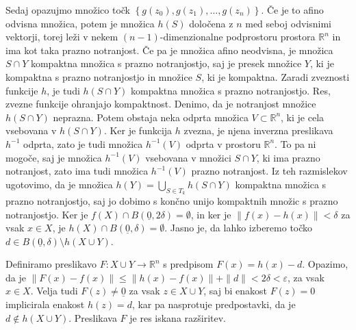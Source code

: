 \documentclass[mat1]{fmfdelo}
\newcommand{\R}{\mathbb R}
\newcommand{\0}{\underline{0}}
\begin{document}
\begin{dokaz}
Sedaj opazujmo množico točk $\left \{ g(z_0), g(z_1), \dots, g(z_n) \right \}$. Če je to afino odvisna množica, potem je množica $h(S)$ določena z $n$ med seboj odvisnimi vektorji, torej leži v nekem $(n-1)$-dimenzionalne podprostoru prostora $\R^n$ in ima kot taka prazno notranjost. Če pa je množica afino neodvisna, je množica $S \cap Y$ kompaktna množica s prazno notranjostjo, saj je presek množice $Y$, ki je kompaktna s prazno notranjostjo in množice $S$, ki je kompaktna. Zaradi zveznosti funkcije $h$, je tudi $h(S \cap Y)$ kompaktna množica s prazno notranjostjo. Res, zvezne funkcije ohranjajo kompaktnost. Denimo, da je notranjost množice $h(S \cap Y)$ neprazna. Potem obstaja neka odprta množica $V \subset \R^n$, ki je cela vsebovana v $h(S \cap Y)$. Ker je funkcija $h$ zvezna, je njena inverzna preslikava $h^{-1}$ odprta, zato je tudi množica $h^{-1}(V)$ odprta v prostoru $\R^n$. To pa ni mogoče, saj je množica $h^{-1}(V)$ vsebovana v množici $S \cap Y$, ki ima prazno notranjost, zato ima tudi množica $h^{-1}(V)$ prazno notranjost. Iz teh razmislekov ugotovimo, da je množica $h(Y) = \bigcup\limits_{S \in T_k} h(S \cap Y)$ kompaktna množica s prazno notranjostjo, saj jo dobimo s končno unijo kompaktnih množic s prazno notranjostjo. Ker je $f(X) \cap B(\0, 2 \delta) = \emptyset$, in ker je $\| f(x) - h(x) \| < \delta$ za vsak $x \in X$, je $h(X) \cap B(\0, \delta) = \emptyset$. Jasno je, da lahko izberemo točko $d \in B(\0, \delta) \setminus h(X \cup Y)$.

Definiramo preslikavo $F : X \cup Y \to \R^n$ s predpisom $F(x)  = h(x) - d$. Opazimo, da je $\| F(x) - f(x) \| \leq \| h(x) - f(x) \| + \| d \| < 2\delta < \varepsilon$, za vsak $x \in X$. Velja tudi $F(z) \neq \0$ za vsak $z \in X \cup Y$, saj bi enakost $F(z) = 0$ implicirala enakost $h(z) = d$, kar pa nasprotuje predpostavki, da je $d \notin h(X \cup Y)$. Preslikava $F$ je res iskana razširitev.
\end{dokaz}

\end{document}
